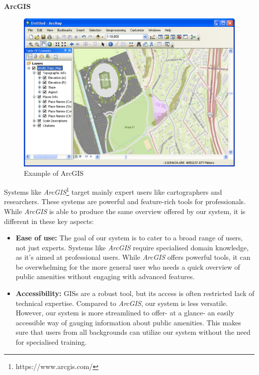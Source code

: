 \noindent{}\textbf{ArcGIS}

\begin{figure}[h]
  \centering
  \includegraphics[width=0.85\columnwidth]{images/arcgis.png}
  \caption{Example of ArcGIS}
  \label{fig:arcgis}
\end{figure}

\noindent{}Systems like \textit{ArcGIS}\footnote{https://www.arcgis.com/} target
mainly expert users like cartographers and researchers. These systems are powerful
and feature-rich tools for professionals. While \textit{ArcGIS} is able to produce
the same overview offered by our system, it is different in these key aspects:

\begin{samepage}
\begin{itemize}
    \item{\textbf{Ease of use:} The goal of our system is to cater to a broad
    range of users, not just experts. Systems like \textit{ArcGIS} require
    specialised domain knowledge, as it's aimed at professional users. While
    \textit{ArcGIS} offers powerful tools, it can be overwhelming for the more
    general user who needs a quick overview of public amenities without engaging
    with advanced features.}
  \vspace{1.25mm}

  \item{\textbf{Accessibility:} GISs are a robust tool, but its access is often
  restricted lack of technical expertise. Compared to \textit{ArcGIS}, our
  system is less versatile. However, our system is more streamlined to offer- at
  a glance- an easily accessible way of gauging information about public
  amenities. This makes sure that users from all backgrounds can utilize our
  system without the need for specialised training.}
  \vspace{1.25mm}

\end{itemize}
\end{samepage}

\pagebreak{}